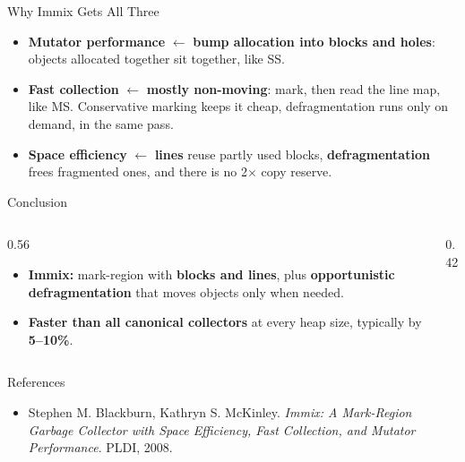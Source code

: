 \documentclass[aspectratio=169]{beamer}
\begin{document}
\begin{frame}{Why Immix Gets All Three}
	\begin{itemize}
		\item \textcolor{themeAccent}{\textbf{Mutator performance}} $\leftarrow$ \textbf{bump allocation into blocks and holes}: objects allocated together sit together, like SS.
		\item \textcolor{themeAccent}{\textbf{Fast collection}} $\leftarrow$ \textbf{mostly non-moving}: mark, then read the line map, like MS. Conservative marking keeps it cheap, defragmentation runs only on demand, in the same pass.
		\item \textcolor{themeAccent}{\textbf{Space efficiency}} $\leftarrow$ \textbf{lines} reuse partly used blocks, \textbf{defragmentation} frees fragmented ones, and there is no 2$\times$ copy reserve.
	\end{itemize}
\end{frame}

\begin{frame}{Conclusion}
	\begin{columns}[c]
		\begin{column}{0.56\textwidth}
			\begin{itemize}
				\item \textbf{Immix:} mark-region with \textbf{blocks and lines}, plus \textbf{opportunistic defragmentation} that moves objects only when needed.
				\item \textbf{Faster than all canonical collectors} at every heap size, typically by \textbf{5--10\%}.
			\end{itemize}
		\end{column}

		\begin{column}{0.42\textwidth}
			\centering
		\end{column}
	\end{columns}
\end{frame}

\begin{frame}{References}
	\begin{itemize}
		\item Stephen M. Blackburn, Kathryn S. McKinley. \emph{Immix: A Mark-Region Garbage Collector with Space Efficiency, Fast Collection, and Mutator Performance}. PLDI, 2008.
	\end{itemize}
\end{frame}
\end{document}
